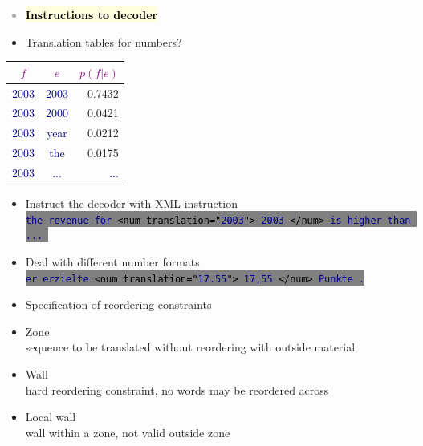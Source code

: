 \documentclass[landscape]{uedslides2C}
\newcommand{\example}[1]{\textcolor{darkblue}{\rm #1}}
\newcommand{\maths}[1]{\textcolor{purple}{#1}}
\newcommand{\currenttopic}[1]{\colorbox{lightyellow}{\textcolor{black}{\bf #1}}}
\newcommand{\littlecode}[1]{\colorbox{gray}{\textcolor{black}{\small \tt #1}}}
\begin{document}

\vspace{-5mm}
\textcolor{darkgrey}{
\begin{itemize} \itemsep -1mm
\item \currenttopic{Instructions to decoder}
\end{itemize}
}



\begin{itemize}
\item Translation tables for numbers?
\end{itemize}
\begin{center} \begin{tabular}{c|c|r}
\maths{$f$} & \maths{$e$} & \maths{$p(f|e)$} \\ \hline
\example{2003} & \example{2003} & 0.7432 \\ \hline
\example{2003} & \example{2000} & 0.0421 \\ \hline
\example{2003} & \example{year} & 0.0212 \\ \hline
\example{2003} & \example{the} & 0.0175 \\ \hline
\example{2003} & \example{...} & \example{...} \\ \hline
\end{tabular} \end{center}
\begin{itemize}
\item Instruct the decoder with XML instruction\\[2mm]
\littlecode{\example{the revenue for} <num translation="\example{2003}"> \example{2003}
  </num> \example{is higher than ...} }
\item Deal with different number formats\\[2mm]
\littlecode{\example{er erzielte} <num translation="\example{17.55}"> \example{17,55} </num> \example{Punkte .}}
\end{itemize}


\vspace{10mm}
\begin{itemize}
\item Specification of reordering constraints
\item Zone\\[2mm] sequence to be translated without reordering with outside material
\item Wall\\[2mm] hard reordering constraint, no words may be reordered across
\item Local wall\\[2mm] wall within a zone, not valid outside zone
\end{itemize}
\end{document}
